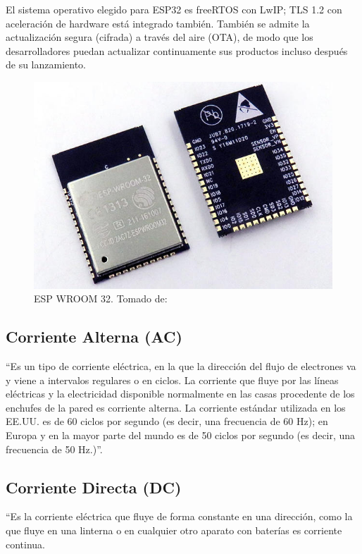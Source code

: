 El sistema operativo elegido para ESP32 es freeRTOS con LwIP; TLS 1.2 con aceleración de hardware está integrado también. También se admite la actualización segura (cifrada) a través del aire (OTA), de modo que los desarrolladores puedan actualizar continuamente sus productos incluso después de su lanzamiento.\cite{EW32}

\begin{figure}[H]
	\centering
	\caption{ESP WROOM 32. Tomado de: \cite{ESPIMG}}
	\label{fig:esp32-wroom-s32-00}
	\includegraphics{Imagenes/esp32-wroom-s32-00}
\end{figure}

\subsection{Corriente Alterna (AC)}

``Es un tipo de corriente eléctrica, en la que la dirección del flujo de electrones va y viene a intervalos regulares o en ciclos. La corriente que fluye por las líneas eléctricas y la electricidad disponible normalmente en las casas procedente de los enchufes de la pared es corriente alterna. La corriente estándar utilizada en los EE.UU. es de 60 ciclos por segundo (es decir, una frecuencia de 60 Hz); en Europa y en la mayor parte del mundo es de 50 ciclos por segundo (es decir, una frecuencia de 50 Hz.)''. \cite{Cor}

\subsection{Corriente Directa (DC)}

``Es la corriente eléctrica que fluye de forma constante en una dirección, como la que fluye en una linterna o en cualquier otro aparato con baterías es corriente continua.

